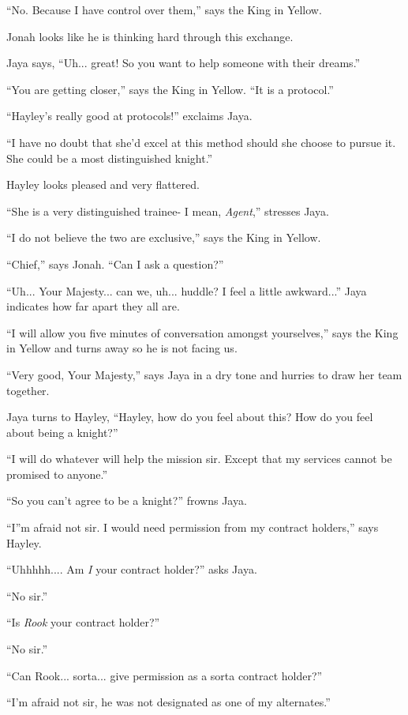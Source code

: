 ``No.  Because I have control over them,'' says the King in Yellow.

Jonah looks like he is thinking hard through this exchange.

Jaya says, ``Uh... great!  So you want to help someone with their dreams.''

``You are getting closer,'' says the King in Yellow. ``It is a protocol.''

``Hayley's really good at protocols!'' exclaims Jaya.

``I have no doubt that she'd excel at this method should she choose to pursue it.  She could be a most distinguished knight.''

Hayley looks pleased and very flattered.

``She is a very distinguished trainee- I mean, \textit{Agent},'' stresses Jaya.

``I do not believe the two are exclusive,'' says the King in Yellow.



``Chief,'' says Jonah. ``Can I ask a question?''

``Uh... Your Majesty... can we, uh... huddle?  I feel a little awkward...'' Jaya indicates how far apart they all are.

``I will allow you five minutes of conversation amongst yourselves,'' says the King in Yellow and turns away so he is not facing us.

``Very good, Your Majesty,'' says Jaya in a dry tone and hurries to draw her team together.



Jaya turns to Hayley, ``Hayley, how do you feel about this?  How do you feel about being a knight?''

``I will do whatever will help the mission sir.  Except that my services cannot be promised to anyone.''

``So you can't agree to be a knight?'' frowns Jaya.

``I''m afraid not sir.  I would need permission from my contract holders,'' says Hayley.

``Uhhhhh.... Am \textit{I} your contract holder?'' asks Jaya.

``No sir.''

``Is \textit{Rook} your contract holder?''

``No sir.''

``Can Rook... sorta... give permission as a sorta contract holder?''

``I'm afraid not sir, he was not designated as one of my alternates.''

